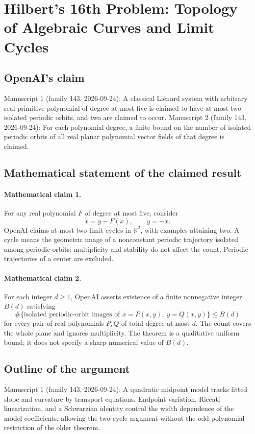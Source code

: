 \documentclass[11pt]{article}
\begin{document}
\section*{Hilbert's 16th Problem: Topology of Algebraic Curves and Limit Cycles}

\subsection{OpenAI's claim}
Manuscript 1 (family 143, 2026-09-24): A classical Liénard system with arbitrary real primitive polynomial of degree at most five is claimed to have at most two isolated periodic orbits, and two are claimed to occur. Manuscript 2 (family 143, 2026-09-24): For each polynomial degree, a finite bound on the number of isolated periodic orbits of all real planar polynomial vector fields of that degree is claimed.

\subsection{Mathematical statement of the claimed result}
\paragraph{Mathematical claim 1.} For any real polynomial $F$ of degree at most five, consider
\[
\dot x=y-F(x),\qquad\dot y=-x.
\]
OpenAI claims at most two limit cycles in $\mathbb R^2$, with examples attaining two. A cycle means the geometric image of a nonconstant periodic trajectory isolated among periodic orbits; multiplicity and stability do not affect the count. Periodic trajectories of a center are excluded.

\paragraph{Mathematical claim 2.} For each integer $d\ge1$, OpenAI asserts existence of a finite nonnegative integer $B(d)$ satisfying
\[
\#\{\text{isolated periodic-orbit images of }\dot x=P(x,y),\ \dot y=Q(x,y)\}\le B(d)
\]
for every pair of real polynomials $P,Q$ of total degree at most $d$. The count covers the whole plane and ignores multiplicity. The theorem is a qualitative uniform bound; it does not specify a sharp numerical value of $B(d)$.

\subsection{Outline of the argument}
Manuscript 1 (family 143, 2026-09-24): A quadratic midpoint model tracks fitted slope and curvature by transport equations. Endpoint variation, Riccati linearization, and a Schwarzian identity control the width dependence of the model coefficients, allowing the two-cycle argument without the odd-polynomial restriction of the older theorem.
\end{document}
